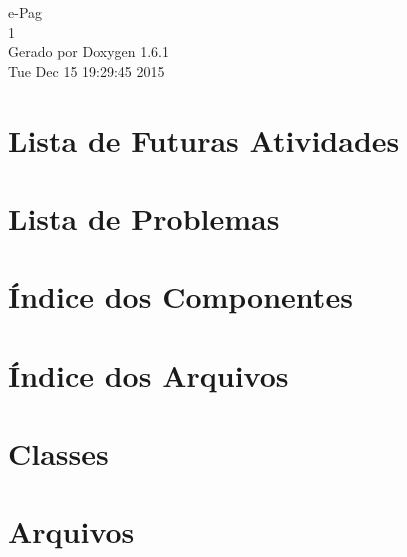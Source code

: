 \documentclass[a4paper]{book}
\begin{document}
\hypersetup{pageanchor=false}
\begin{titlepage}
\vspace*{7cm}
\begin{center}
{\Large e-\/Pag \\[1ex]\large 1 }\\
\vspace*{1cm}
{\large Gerado por Doxygen 1.6.1}\\
\vspace*{0.5cm}
{\small Tue Dec 15 19:29:45 2015}\\
\end{center}
\end{titlepage}
\clearemptydoublepage
{}
\tableofcontents
\clearemptydoublepage
{}
\hypersetup{pageanchor=true}
\chapter{Lista de Futuras Atividades}
\label{todo}
\hypertarget{todo}{}

\chapter{Lista de Problemas}
\label{bug}
\hypertarget{bug}{}

\chapter{Índice dos Componentes}

\chapter{Índice dos Arquivos}

\chapter{Classes}







\chapter{Arquivos}

\printindex
\end{document}
